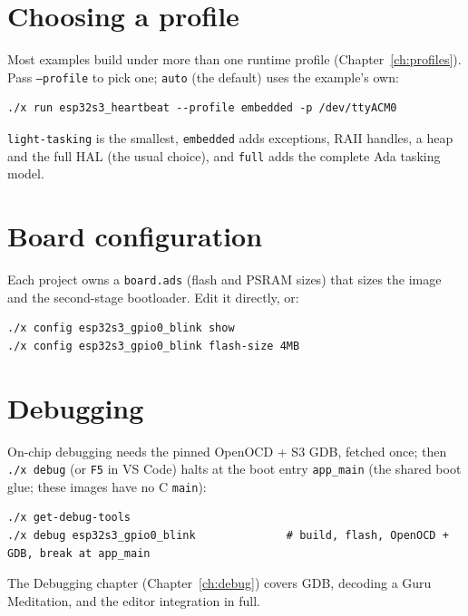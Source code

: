 \section{Choosing a profile}

Most examples build under more than one runtime profile (Chapter~\ref{ch:profiles}).
Pass \texttt{--profile} to pick one; \texttt{auto} (the default) uses the
example's own:

\begin{lstlisting}[style=sh]
./x run esp32s3_heartbeat --profile embedded -p /dev/ttyACM0
\end{lstlisting}

\texttt{light-tasking} is the smallest, \texttt{embedded} adds exceptions, RAII
handles, a heap and the full HAL (the usual choice), and \texttt{full} adds the
complete Ada tasking model.

\section{Board configuration}

Each project owns a \texttt{board.ads} (flash and PSRAM sizes) that sizes the image
and the second-stage bootloader. Edit it directly, or:

\begin{lstlisting}[style=sh]
./x config esp32s3_gpio0_blink show
./x config esp32s3_gpio0_blink flash-size 4MB
\end{lstlisting}

\section{Debugging}

On-chip debugging needs the pinned OpenOCD + S3 GDB, fetched once; then
\texttt{./x debug} (or \texttt{F5} in VS Code) halts at the boot entry
\texttt{app\_main} (the shared boot glue; these images have no C \texttt{main}):

\begin{lstlisting}[style=sh]
./x get-debug-tools
./x debug esp32s3_gpio0_blink              # build, flash, OpenOCD + GDB, break at app_main
\end{lstlisting}

The Debugging chapter (Chapter~\ref{ch:debug}) covers GDB, decoding a Guru
Meditation, and the editor integration in full.

